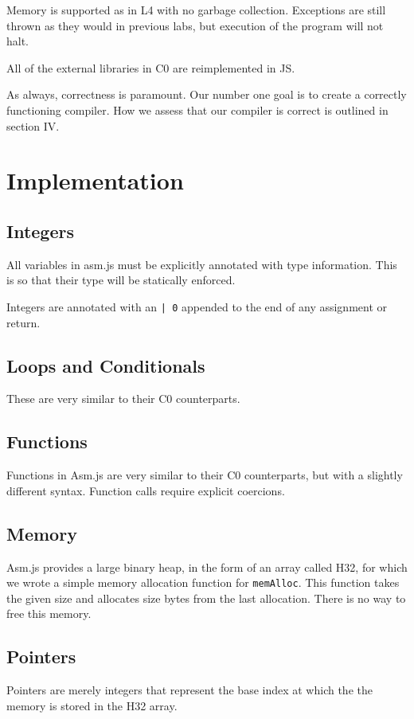 \documentclass[twoside]{article}
\begin{document}
\begin{multicols}{2}
  Memory is supported as in L4 with no garbage collection. Exceptions are
  still thrown as they would in previous labs, but execution of the program
  will not halt.

  All of the external libraries in C0 are reimplemented in JS.

As always, correctness is paramount. Our number one goal is to create a correctly
functioning compiler. How we assess that our compiler is correct is outlined in
section IV.


\section{Implementation}

  \subsection{Integers}
    All variables in asm.js must be explicitly annotated with type information.
    This is so that their type will be statically enforced.

    Integers are annotated with an \texttt{| 0} appended to the end of any
    assignment or return.
  \subsection{Loops and Conditionals}
    These are very similar to their C0 counterparts.
  \subsection{Functions}
    Functions in Asm.js are very similar to their C0 counterparts, but with a
    slightly different syntax. Function calls require explicit coercions.
  \subsection{Memory}
    Asm.js provides a large binary heap, in the form of an array called H32, for which we
    wrote a simple memory allocation function for \texttt{memAlloc}. This function takes the given
    size and allocates size bytes from the last allocation. There is no way to
    free this memory.
  \subsection{Pointers}
    Pointers are merely integers that represent the base index at which the
    the memory is stored in the H32 array.


\end{multicols}
\end{document}
